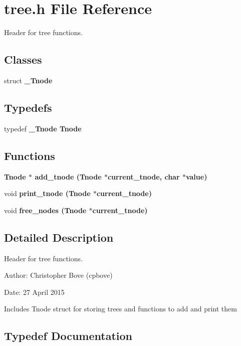 \section{tree.h File Reference}
\label{tree_8h}
Header for tree functions. 

\subsection*{Classes}
\begin{CompactItemize}
\item 
struct \bf{\_\-Tnode}
\end{CompactItemize}
\subsection*{Typedefs}
\begin{CompactItemize}
\item 
typedef \bf{\_\-Tnode} \bf{Tnode}
\end{CompactItemize}
\subsection*{Functions}
\begin{CompactItemize}
\item 
\bf{Tnode} $\ast$ \bf{add\_\-tnode} (\bf{Tnode} $\ast$current\_\-tnode, char $\ast$value)
\item 
void \bf{print\_\-tnode} (\bf{Tnode} $\ast$current\_\-tnode)
\item 
void \bf{free\_\-nodes} (\bf{Tnode} $\ast$current\_\-tnode)
\end{CompactItemize}


\subsection{Detailed Description}
Header for tree functions. 

\begin{Desc}
\item[Author:]Christopher Bove (cpbove) \end{Desc}
\begin{Desc}
\item[Date:]27 April 2015\end{Desc}
Includes Tnode struct for storing trees and functions to add and print them 

\subsection{Typedef Documentation}
